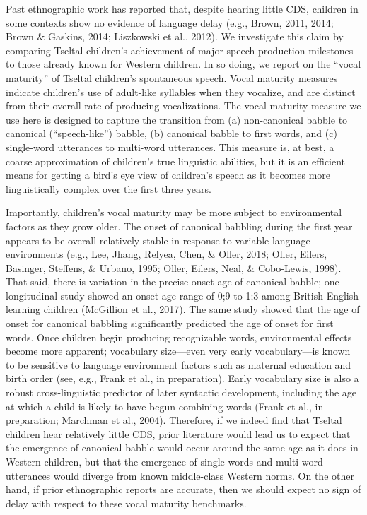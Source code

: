 \documentclass[floatsintext,man]{apa6}
\theoremstyle{definition}
\theoremstyle{definition}
\theoremstyle{definition}
\theoremstyle{remark}
\begin{document}
Past ethnographic work has reported that, despite hearing little CDS,
children in some contexts show no evidence of language delay (e.g.,
Brown, 2011, 2014; Brown \& Gaskins, 2014; Liszkowski et al., 2012). We
investigate this claim by comparing Tseltal children's achievement of
major speech production milestones to those already known for Western
children. In so doing, we report on the \enquote{vocal maturity} of
Tseltal children's spontaneous speech. Vocal maturity measures indicate
children's use of adult-like syllables when they vocalize, and are
distinct from their overall rate of producing vocalizations. The vocal
maturity measure we use here is designed to capture the transition from
(a) non-canonical babble to canonical (\enquote{speech-like}) babble,
(b) canonical babble to first words, and (c) single-word utterances to
multi-word utterances. This measure is, at best, a coarse approximation
of children's true linguistic abilities, but it is an efficient means
for getting a bird's eye view of children's speech as it becomes more
linguistically complex over the first three years.

Importantly, children's vocal maturity may be more subject to
environmental factors as they grow older. The onset of canonical
babbling during the first year appears to be overall relatively stable
in response to variable language environments (e.g., Lee, Jhang, Relyea,
Chen, \& Oller, 2018; Oller, Eilers, Basinger, Steffens, \& Urbano,
1995; Oller, Eilers, Neal, \& Cobo-Lewis, 1998). That said, there is
variation in the precise onset age of canonical babble; one longitudinal
study showed an onset age range of 0;9 to 1;3 among British
English-learning children (McGillion et al., 2017). The same study
showed that the age of onset for canonical babbling significantly
predicted the age of onset for first words. Once children begin
producing recognizable words, environmental effects become more
apparent; vocabulary size---even very early vocabulary---is known to be
sensitive to language environment factors such as maternal education and
birth order (see, e.g., Frank et al., in preparation). Early vocabulary
size is also a robust cross-linguistic predictor of later syntactic
development, including the age at which a child is likely to have begun
combining words (Frank et al., in preparation; Marchman et al., 2004).
Therefore, if we indeed find that Tseltal children hear relatively
little CDS, prior literature would lead us to expect that the emergence
of canonical babble would occur around the same age as it does in
Western children, but that the emergence of single words and multi-word
utterances would diverge from known middle-class Western norms. On the
other hand, if prior ethnographic reports are accurate, then we should
expect no sign of delay with respect to these vocal maturity benchmarks.
\end{document}
